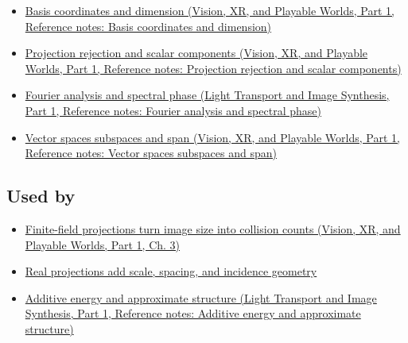 \hypertarget{appendix-3c73f7862157-prerequisites}{}

\begin{itemize}
\tightlist
\item
  \href{../07-Vision-XR-and-Playable-Worlds-P01/main.pdf\#nameddest=appendix-ce0341f7ea0d}{Basis coordinates and dimension (Vision, XR, and Playable Worlds, Part 1, Reference notes: Basis coordinates and dimension)}
\item
  \href{../07-Vision-XR-and-Playable-Worlds-P01/main.pdf\#nameddest=appendix-505a502c372a}{Projection rejection and scalar components (Vision, XR, and Playable Worlds, Part 1, Reference notes: Projection rejection and scalar components)}
\item
  \href{../04-Light-Transport-and-Image-Synthesis-P01/main.pdf\#nameddest=appendix-b60686ba06a1}{Fourier analysis and spectral phase (Light Transport and Image Synthesis, Part 1, Reference notes: Fourier analysis and spectral phase)}
\item
  \href{../07-Vision-XR-and-Playable-Worlds-P01/main.pdf\#nameddest=appendix-173b52c063ae}{Vector spaces subspaces and span (Vision, XR, and Playable Worlds, Part 1, Reference notes: Vector spaces subspaces and span)}
\end{itemize}

\subsection{Used by}\label{appendix-3c73f7862157-used-by}

\hypertarget{appendix-3c73f7862157-used-by}{}

\begin{itemize}
\tightlist
\item
  \href{../07-Vision-XR-and-Playable-Worlds-P01/main.pdf\#nameddest=04-visual-computing-ii-ch032-finite-field-projections-turn-image-size-into-collision-counts}{Finite-field projections turn image size into collision counts (Vision, XR, and Playable Worlds, Part 1, Ch. 3)}
\item
  \hyperref[04-visual-computing-ii-ch033-real-projections-add-scale-spacing-and-incidence-geometry]{Real projections add scale, spacing, and incidence geometry}
\item
  \href{../04-Light-Transport-and-Image-Synthesis-P01/main.pdf\#nameddest=appendix-b0732b22e7d6}{Additive energy and approximate structure (Light Transport and Image Synthesis, Part 1, Reference notes: Additive energy and approximate structure)}
\end{itemize}

